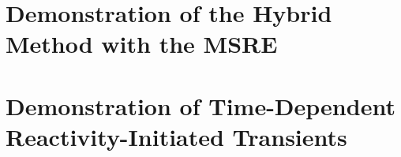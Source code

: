 \documentclass[11pt]{uiucthesis2021}
\newcounter{counterforappendices}
\begin{document}
\chapter{Demonstration of the Hybrid Method with the MSRE}
\label{chap:msre}

\glsresetall

\chapter{Demonstration of Time-Dependent Reactivity-Initiated Transients}
\label{chap:transient}

\glsresetall

\backmatter

% 
\printbibliography[heading=bibintoc,title={References}]

\clearpage
\setcounter{counterforappendices}{\value{page}}
\mainmatter
\setcounter{page}{\value{counterforappendices}}
\appendix
%
\end{document}
